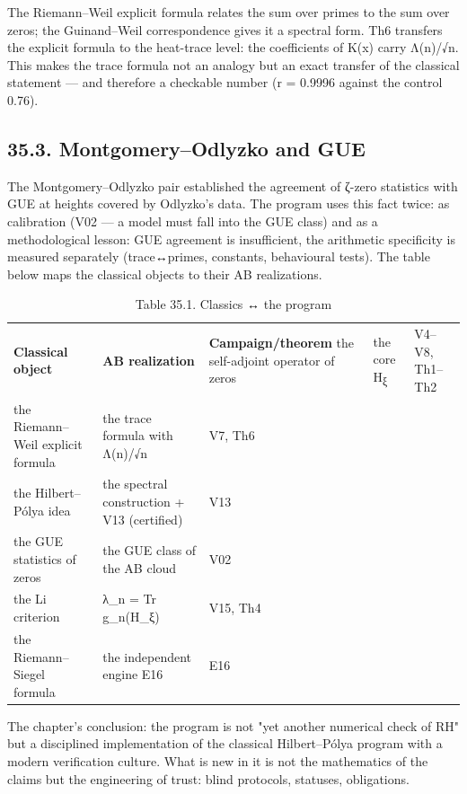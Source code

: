 \documentclass[11pt,a4paper]{article}
\begin{document}
The Riemann–Weil explicit formula relates the sum over primes to the sum over zeros; the Guinand–Weil correspondence gives it a spectral form. Th6 transfers the explicit formula to the heat-trace level: the coefficients of K(x) carry Λ(n)/√n. This makes the trace formula not an analogy but an exact transfer of the classical statement — and therefore a checkable number (r = 0.9996 against the control 0.76).

\subsection{35.3. Montgomery–Odlyzko and GUE}

The Montgomery–Odlyzko pair established the agreement of ζ-zero statistics with GUE at heights covered by Odlyzko's data. The program uses this fact twice: as calibration (V02 — a model must fall into the GUE class) and as a methodological lesson: GUE agreement is insufficient, the arithmetic specificity is measured separately (trace↔primes, constants, behavioural tests). The table below maps the classical objects to their AB realizations.

\begin{table}[htbp]\centering\small
\caption{Table 35.1. Classics ↔ the program}
\begin{tabular}{p{} p{} p{}}
\toprule
\textbf{Classical object} & \textbf{AB realization} & \textbf{Campaign/theorem}
\midrule
the self-adjoint operator of zeros & the core H\textsubscript{ξ} & V4–V8, Th1–Th2 \\
the Riemann–Weil explicit formula & the trace formula with Λ(n)/√n & V7, Th6 \\
the Hilbert–Pólya idea & the spectral construction + V13 (certified) & V13 \\
the GUE statistics of zeros & the GUE class of the AB cloud & V02 \\
the Li criterion & λ\_n = Tr g\_n(H\_ξ) & V15, Th4 \\
the Riemann–Siegel formula & the independent engine E16 & E16 \\
\bottomrule
\end{tabular}
\end{table}

The chapter's conclusion: the program is not "yet another numerical check of RH" but a disciplined implementation of the classical Hilbert–Pólya program with a modern verification culture. What is new in it is not the mathematics of the claims but the engineering of trust: blind protocols, statuses, obligations.
\end{document}
